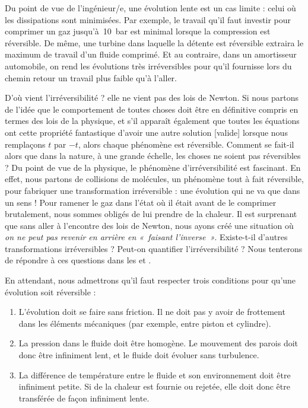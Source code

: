 		Du point de vue de l’ingénieur/e, une évolution lente est un cas limite : celui où les dissipations sont minimisées. Par exemple, le travail qu’il faut investir pour comprimer un gaz jusqu’à~\SI{10}{\bar} est minimal lorsque la compression est réversible. De même, une turbine dans laquelle la détente est réversible extraira le maximum de travail d’un fluide comprimé. Et au contraire, dans un amortisseur automobile, on rend les évolutions très irréversibles pour qu’il fournisse lors du chemin retour un travail plus faible qu’à l’aller.
		
		D’où vient l’irréversibilité ? elle ne vient pas des lois de Newton. Si nous partons de l’idée que le comportement de toutes choses doit être en définitive compris en termes des lois de la physique, et s’il apparaît également que toutes les équations ont cette propriété fantastique d’avoir une autre solution [valide] lorsque nous remplaçons $t$ par $-t$, alors chaque phénomène est réversible. Comment se fait-il alors que dans la nature, à une grande échelle, les choses ne soient pas réversibles ?
		Du point de vue de la physique, le phénomène d’irréversibilité est fascinant. En effet, nous partons de collisions de molécules, un phénomène tout à fait réversible, pour fabriquer une transformation irréversible : une évolution qui ne va que dans un sens ! Pour ramener le gaz dans l’état où il était avant de le comprimer brutalement, nous sommes obligés de lui prendre de la chaleur. Il est surprenant que sans aller à l’encontre des lois de Newton, nous ayons créé une situation où \emph{on ne peut pas revenir en arrière en «~faisant l’inverse~»}. Existe-t-il d’autres transformations irréversibles ? Peut-on quantifier l’irréversibilité ? Nous tenterons de répondre à ces questions dans les \courssept et \courshuit.

		En attendant, nous admettrons qu’il faut respecter trois conditions pour qu’une évolution soit réversible :

		\begin{enumerate}
			\item L’évolution doit se faire sans friction. Il ne doit pas y avoir de frottement dans les éléments mécaniques (par exemple, entre piston et cylindre).
			\item La pression dans le fluide doit être homogène. Le mouvement des parois doit donc être infiniment lent, et le fluide doit évoluer sans turbulence.
			\item La différence de température entre le fluide et son environnement doit être infiniment petite. Si de la chaleur est fournie ou rejetée, elle doit donc être transférée de façon infiniment lente.
		\end{enumerate}

